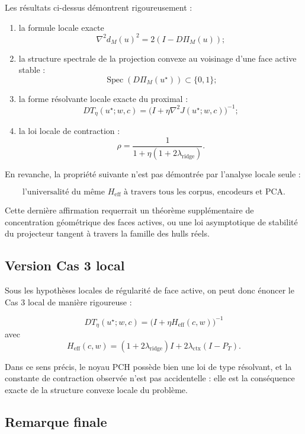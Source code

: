 Les résultats ci-dessus démontrent rigoureusement :

\begin{enumerate}
\item la formule locale exacte
\[
\nabla^2 d_M(u)^2=2(I-D\Pi_M(u));
\]

\item la structure spectrale de la projection convexe au voisinage d'une face active stable :
\[
\operatorname{Spec}(D\Pi_M(u^\star))\subset\{0,1\};
\]

\item la forme résolvante locale exacte du proximal :
\[
DT_\eta(u^\star;w,c)
=
\bigl(I+\eta\nabla^2J(u^\star;w,c)\bigr)^{-1};
\]

\item la loi locale de contraction :
\[
\rho
=
\frac1{1+\eta(1+2\lambda_{\mathrm{ridge}})}.
\]
\end{enumerate}

En revanche, la propriété suivante n'est pas démontrée par l'analyse locale seule :

\[
\text{l'universalité du même }H_{\mathrm{eff}}\text{ à travers tous les corpus, encodeurs et PCA.}
\]

Cette dernière affirmation requerrait un théorème supplémentaire de concentration géométrique des faces actives, ou une loi asymptotique de stabilité du projecteur tangent à travers la famille des hulls réels.

\subsection{Version Cas 3 local}

Sous les hypothèses locales de régularité de face active, on peut donc énoncer le Cas 3 local de manière rigoureuse :

\[
\boxed{
DT_\eta(u^\star;w,c)
=
\bigl(I+\eta H_{\mathrm{eff}}(c,w)\bigr)^{-1}
}
\]
avec
\[
H_{\mathrm{eff}}(c,w)
=
(1+2\lambda_{\mathrm{ridge}})I+2\lambda_{\mathrm{ctx}}(I-P_T).
\]

Dans ce sens précis, le noyau PCH possède bien une loi de type résolvant, et la constante de contraction observée n'est pas accidentelle : elle est la conséquence exacte de la structure convexe locale du problème.

\subsection{Remarque finale}

